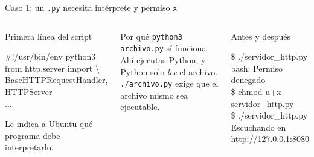 \documentclass[aspectratio=169,10pt,c]{beamer}
\begin{document}
\begin{frame}{Caso 1: un \texttt{.py} necesita intérprete y permiso \texttt{x}}
\begin{columns}[T,onlytextwidth]
\begin{exampleblock}{Primera línea del script}
\begin{terminal}\footnotesize
\#!/usr/bin/env python3\\
from http.server import \textbackslash\\
\quad BaseHTTPRequestHandler, HTTPServer\\
...
\end{terminal}
\small Le indica a Ubuntu qué programa debe interpretarlo.
\end{exampleblock}
\begin{block}{Por qué \texttt{python3 archivo.py} sí funciona}
\small Ahí ejecutas Python, y Python solo \emph{lee} el archivo. \texttt{./archivo.py} exige que el archivo mismo sea ejecutable.
\end{block}
\begin{exampleblock}{Antes y después}
\begin{terminal}\footnotesize
\$ ./servidor\_http.py\\
bash: Permiso denegado\\
\$ chmod u+x servidor\_http.py\\
\$ ./servidor\_http.py\\
Escuchando en \\
http://127.0.0.1:8080
\end{terminal}
\end{exampleblock}
\end{columns}
\end{frame}
\end{document}
